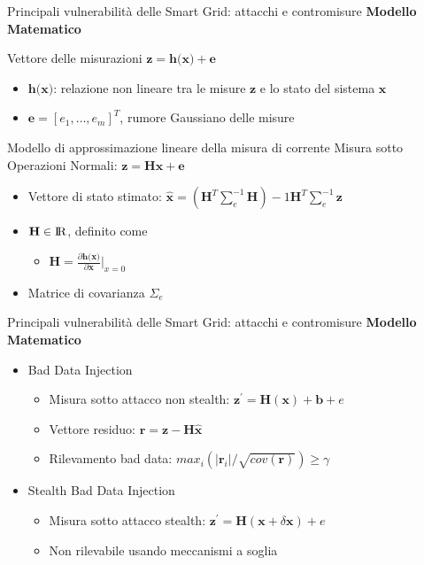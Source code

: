 \begin{frame}{Principali vulnerabilità delle Smart Grid: attacchi e contromisure}
\textbf{Modello Matematico}
	\begin{block}{Vettore delle misurazioni} %
		$\textbf{z} = \textbf{h(x)} + \textbf{e}$
		\begin{itemize}
			\item $\textbf{h(x)}$: relazione non lineare tra le misure $\textbf{z}$ e lo stato del sistema $\textbf{x}$
			\item $\textbf{e} = [e_1, \ldots, e_m]^T$, rumore Gaussiano delle misure
		\end{itemize}
	\end{block}
	\pause
	\begin{block}{Modello di approssimazione lineare della misura di corrente}
		Misura sotto Operazioni Normali: $\textbf{z} =  \textbf{Hx} + \textbf{e}$
		\begin{itemize}
			\item Vettore di stato stimato: $\widehat{\textbf{x}} = (\textbf{H}^T\sum_e^{-1}\textbf{H})-1\textbf{H}^T\sum_e^{-1}\textbf{z}$
			\item $\textbf{H} \in {\rm I\!R}$, definito come
			\begin{itemize}
				\item $\textbf{H}=\frac{\partial\textbf{h(x)}}{\partial\textbf{x}}|_{x=0}$
			\end{itemize}
			\item Matrice di covarianza $\Sigma_e$
		\end{itemize}
	\end{block}
\end{frame}

\begin{frame}{Principali vulnerabilità delle Smart Grid: attacchi e contromisure}
	\textbf{Modello Matematico}
	\begin{itemize}
	\item Bad Data Injection
	\begin{itemize}
		\item Misura sotto attacco non stealth: $\textbf{z}^\prime = \textbf{H}(\textbf{x}) + \textbf{b} + e$
		\item Vettore residuo: $\textbf{r} = \textbf{z} - \textbf{H}\widehat{\textbf{x}}$
		\item Rilevamento bad data: $max_i(|\textbf{r}_i|/\sqrt{cov(\textbf{r})}) \geq \gamma$
	\end{itemize}
	\item Stealth Bad Data Injection
	\begin{itemize}
		\item Misura sotto attacco stealth: $\textbf{z}^\prime = \textbf{H}(\textbf{x} + \delta\textbf{x}) + e$
		\item Non rilevabile usando meccanismi a soglia
	\end{itemize}
\end{itemize}
\end{frame}

